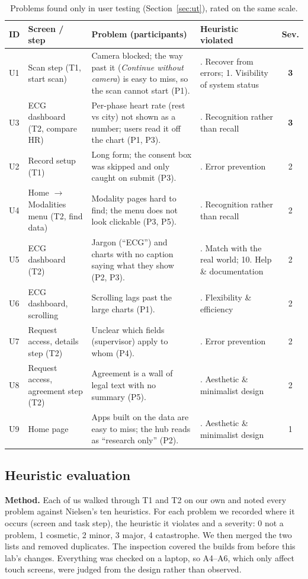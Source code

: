 \documentclass[10pt,a4paper,twocolumn]{article}
\begin{document}
\begin{table}[t]
\centering\small
\caption{Problems found only in user testing (Section~\ref{sec:ut}), rated on the same scale.}
\label{tab:ut}
\begin{tabularx}{\textwidth}{@{}l>{\raggedright\arraybackslash}p{3.3cm}X>{\raggedright\arraybackslash}p{4.6cm}c@{}}
\toprule
ID & Screen / step & Problem (participants) & Heuristic violated & Sev. \\
\midrule
U1 & Scan step (T1, start scan) & Camera blocked; the way past it (\emph{Continue
  without camera}) is easy to miss, so the scan cannot start (P1). &
  9. Recover from errors; 1. Visibility of system status & \textbf{3} \\
U3 & ECG dashboard (T2, compare HR) & Per-phase heart rate (rest vs city) not shown
  as a number; users read it off the chart (P1, P3). &
  6. Recognition rather than recall & \textbf{3} \\
U2 & Record setup (T1) & Long form; the consent box was skipped and only caught on
  submit (P3). & 5. Error prevention & 2 \\
U4 & Home $\rightarrow$ Modalities menu (T2, find data) & Modality pages hard to
  find; the menu does not look clickable (P3, P5). &
  6. Recognition rather than recall & 2 \\
U5 & ECG dashboard (T2) & Jargon (``ECG'') and charts with no caption saying what
  they show (P2, P3). & 2. Match with the real world; 10. Help \& documentation & 2 \\
U6 & ECG dashboard, scrolling & Scrolling lags past the large charts (P1). &
  7. Flexibility \& efficiency & 2 \\
U7 & Request access, details step (T2) & Unclear which fields (supervisor) apply to
  whom (P4). & 5. Error prevention & 2 \\
U8 & Request access, agreement step (T2) & Agreement is a wall of legal text with no
  summary (P5). & 8. Aesthetic \& minimalist design & 2 \\
U9 & Home page & Apps built on the data are easy to miss; the hub reads as
  ``research only'' (P2). & 8. Aesthetic \& minimalist design & 1 \\
\bottomrule
\end{tabularx}
\end{table}

\subsection{Heuristic evaluation}
\textbf{Method.} Each of us walked through T1 and T2 on our own and noted every
problem against Nielsen's ten heuristics. For each problem we recorded where it
occurs (screen and task step), the heuristic it violates and a severity: 0 not a
problem, 1 cosmetic, 2 minor, 3 major, 4 catastrophe. We then merged the two lists
and removed duplicates. The inspection covered the builds from before this lab's
changes. Everything was checked on a laptop, so A4--A6, which only affect touch
screens, were judged from the design rather than observed.
\end{document}
